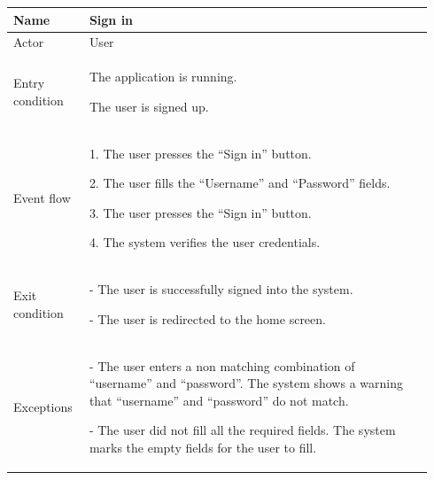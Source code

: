 \begin{table}[H]
\begin{tabular}{|p{0.17\linewidth}|p{0.77\linewidth}|}
\hline
Name            & Sign in
\\ \hline

Actor           & User
\\ \hline

Entry condition &
The application is running.

The user is signed up.
\\ \hline
Event flow      & 
    1. The user presses the “Sign in” button.

    2. The user fills the “Username” and “Password” fields.

    3. The user presses the “Sign in” button.
    
    4. The system verifies the user credentials.
\\ \hline
Exit condition  & 
    - The user is successfully signed into the system.

    - The user is redirected to the home screen.
\\ \hline
Exceptions      &
    - The user enters a non matching combination of “username” and “password”. The system shows a warning that “username” and “password” do not match.

    - The user did not fill all the required fields. The system marks the empty fields for the user to fill.
\\ \hline
\end{tabular}
\end{table}

